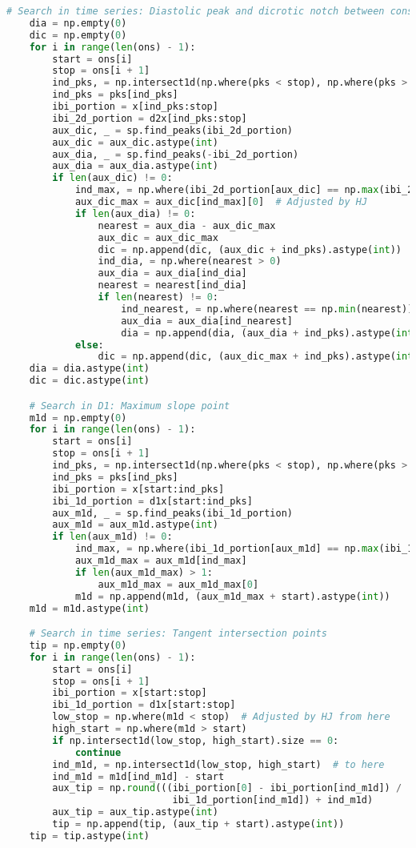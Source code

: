 \begin{lstlisting}[language=Python,label={lst:fidp.py}, basicstyle=\scriptsize]
    # Search in time series: Diastolic peak and dicrotic notch between consecutive onsets
    dia = np.empty(0)
    dic = np.empty(0)
    for i in range(len(ons) - 1):
        start = ons[i]
        stop = ons[i + 1]
        ind_pks, = np.intersect1d(np.where(pks < stop), np.where(pks > start))
        ind_pks = pks[ind_pks]
        ibi_portion = x[ind_pks:stop]
        ibi_2d_portion = d2x[ind_pks:stop]
        aux_dic, _ = sp.find_peaks(ibi_2d_portion)
        aux_dic = aux_dic.astype(int)
        aux_dia, _ = sp.find_peaks(-ibi_2d_portion)
        aux_dia = aux_dia.astype(int)
        if len(aux_dic) != 0:
            ind_max, = np.where(ibi_2d_portion[aux_dic] == np.max(ibi_2d_portion[aux_dic]))
            aux_dic_max = aux_dic[ind_max][0]  # Adjusted by HJ
            if len(aux_dia) != 0:
                nearest = aux_dia - aux_dic_max
                aux_dic = aux_dic_max
                dic = np.append(dic, (aux_dic + ind_pks).astype(int))
                ind_dia, = np.where(nearest > 0)
                aux_dia = aux_dia[ind_dia]
                nearest = nearest[ind_dia]
                if len(nearest) != 0:
                    ind_nearest, = np.where(nearest == np.min(nearest))
                    aux_dia = aux_dia[ind_nearest]
                    dia = np.append(dia, (aux_dia + ind_pks).astype(int))
            else:
                dic = np.append(dic, (aux_dic_max + ind_pks).astype(int))
    dia = dia.astype(int)
    dic = dic.astype(int)

    # Search in D1: Maximum slope point
    m1d = np.empty(0)
    for i in range(len(ons) - 1):
        start = ons[i]
        stop = ons[i + 1]
        ind_pks, = np.intersect1d(np.where(pks < stop), np.where(pks > start))
        ind_pks = pks[ind_pks]
        ibi_portion = x[start:ind_pks]
        ibi_1d_portion = d1x[start:ind_pks]
        aux_m1d, _ = sp.find_peaks(ibi_1d_portion)
        aux_m1d = aux_m1d.astype(int)
        if len(aux_m1d) != 0:
            ind_max, = np.where(ibi_1d_portion[aux_m1d] == np.max(ibi_1d_portion[aux_m1d]))
            aux_m1d_max = aux_m1d[ind_max]
            if len(aux_m1d_max) > 1:
                aux_m1d_max = aux_m1d_max[0]
            m1d = np.append(m1d, (aux_m1d_max + start).astype(int))
    m1d = m1d.astype(int)

    # Search in time series: Tangent intersection points
    tip = np.empty(0)
    for i in range(len(ons) - 1):
        start = ons[i]
        stop = ons[i + 1]
        ibi_portion = x[start:stop]
        ibi_1d_portion = d1x[start:stop]
        low_stop = np.where(m1d < stop)  # Adjusted by HJ from here
        high_start = np.where(m1d > start)
        if np.intersect1d(low_stop, high_start).size == 0:
            continue
        ind_m1d, = np.intersect1d(low_stop, high_start)  # to here
        ind_m1d = m1d[ind_m1d] - start
        aux_tip = np.round(((ibi_portion[0] - ibi_portion[ind_m1d]) /
                             ibi_1d_portion[ind_m1d]) + ind_m1d)
        aux_tip = aux_tip.astype(int)
        tip = np.append(tip, (aux_tip + start).astype(int))
    tip = tip.astype(int)


\end{lstlisting}

